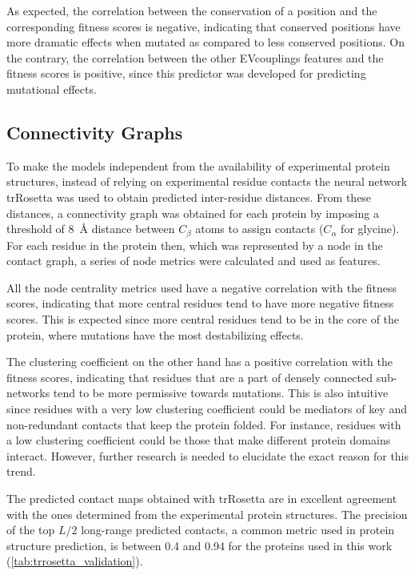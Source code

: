 As expected, the correlation between the conservation of a position and the corresponding fitness scores is negative, indicating that conserved positions have more dramatic effects when mutated as compared to less conserved positions.
On the contrary, the correlation between the other EVcouplings features and the fitness scores is positive, since this predictor was developed for predicting mutational effects.

\subsection{Connectivity Graphs}
To make the models independent from the availability of experimental protein structures, instead of relying on experimental residue contacts the neural network trRosetta was used to obtain predicted inter-residue distances.
From these distances, a connectivity graph was obtained for each protein by imposing a threshold of \SI{8}{\angstrom} distance between $C_\beta$ atoms to assign contacts ($C_\alpha$ for glycine).
For each residue in the protein then, which was represented by a node in the contact graph, a series of node metrics were calculated and used as features.

All the node centrality metrics used have a negative correlation with the fitness scores, indicating that more central residues tend to have more negative fitness scores.
This is expected since more central residues tend to be in the core of the protein, where mutations have the most destabilizing effects.

The clustering coefficient on the other hand has a positive correlation with the fitness scores, indicating that residues that are a part of densely connected sub-networks tend to be more permissive towards mutations.
This is also intuitive since residues with a very low clustering coefficient could be mediators of key and non-redundant contacts that keep the protein folded.
For instance, residues with a low clustering coefficient could be those that make different protein domains interact.
However, further research is needed to elucidate the exact reason for this trend.

The predicted contact maps obtained with trRosetta are in excellent agreement with the ones determined from the experimental protein structures.
The precision of the top $L/2$ long-range predicted contacts, a common metric used in protein structure prediction, is between \num{0.4} and \num{0.94} for the proteins used in this work (\cref{tab:trrosetta_validation}).

